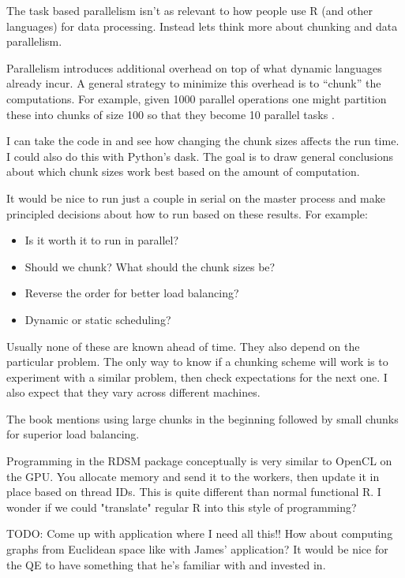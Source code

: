 \documentclass[12pt]{article}
\begin{document}
The task based parallelism isn't as relevant to how people use R (and other
languages) for data processing. Instead
lets think more about chunking and data parallelism. 

Parallelism introduces additional overhead on top of what dynamic languages
already incur. A general strategy to minimize this overhead is to ``chunk''
the computations. For example, given 1000 parallel operations one might
partition these into chunks of size 100 so that they become 10 parallel
tasks \cite{matloff2015parallel}.

I can take the code in \cite{matloff2015parallel} and see how changing the
chunk sizes affects the run time. I could also do this with Python's dask.
The goal is to draw general conclusions about which chunk sizes work best
based on the amount of computation.

It would be nice to run just a couple in serial on the master process and
make principled decisions about how to run based on these results. For
example:
\begin{itemize}
    \item Is it worth it to run in parallel?
    \item Should we chunk? What should the chunk sizes be?
    \item Reverse the order for better load balancing?
    \item Dynamic or static scheduling?
\end{itemize}

Usually none of these are known ahead of time.  They also depend on the
particular problem.  The only way to know if a chunking scheme will work is
to experiment with a similar problem, then check expectations for the next
one. I also expect that they vary across different machines.

The book mentions using large chunks in the beginning followed by small
chunks for superior load balancing.

Programming in the RDSM package conceptually is very similar to OpenCL on
the GPU. You allocate memory and send it to the workers, then update it in
place based on thread IDs. This is quite different than normal functional
R. I wonder if we could "translate" regular R into this style of
programming?

TODO: Come up with application where I need all this!! How about computing
graphs from Euclidean space like with James' application? It would be nice
for the QE to have something that he's familiar with and invested in.
\end{document}
